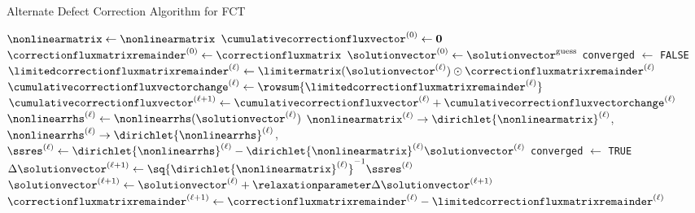 \begin{algorithm}[H]
\caption{Alternate Defect Correction Algorithm for FCT}
\label{alg:defect_correction_fct}
\begin{algorithmic}
\State $\nonlinearmatrix \gets \nonlinearmatrix$
\State $\cumulativecorrectionfluxvector^{(0)} \gets \mathbf{0}$
\State $\correctionfluxmatrixremainder^{(0)} \gets \correctionfluxmatrix$
\State $\solutionvector^{(0)} \gets \solutionvector^{\text{guess}}$
\State \texttt{converged} $\gets$ \texttt{FALSE}
  \State $\limitedcorrectionfluxmatrixremainder^{(\ell)} \gets
    \limitermatrix(\solutionvector^{(\ell)})\odot
    \correctionfluxmatrixremainder^{(\ell)}$
  \State $\cumulativecorrectionfluxvectorchange^{(\ell)} \gets
    \rowsum{\limitedcorrectionfluxmatrixremainder^{(\ell)}}$
  \State $\cumulativecorrectionfluxvector^{(\ell+1)} \gets
    \cumulativecorrectionfluxvector^{(\ell)}
    + \cumulativecorrectionfluxvectorchange^{(\ell)}$
  \State $\nonlinearrhs^{(\ell)} \gets
    \nonlinearrhs(\solutionvector^{(\ell)})$
  \State $\nonlinearmatrix^{(\ell)} \rightarrow
    \dirichlet{\nonlinearmatrix}^{(\ell)}$,
    $\nonlinearrhs^{(\ell)} \rightarrow \dirichlet{\nonlinearrhs}^{(\ell)}$,
  \State $\ssres^{(\ell)} \gets \dirichlet{\nonlinearrhs}^{(\ell)}
    - \dirichlet{\nonlinearmatrix}^{(\ell)}\solutionvector^{(\ell)}$
    \State \texttt{converged} $\gets$ \texttt{TRUE}
    \Break
  \EndIf
  \State $\Delta\solutionvector^{(\ell+1)}
    \gets \sq{\dirichlet{\nonlinearmatrix}^{(\ell)}}^{-1}\ssres^{(\ell)}$
  \State $\solutionvector^{(\ell+1)} \gets \solutionvector^{(\ell)}
    + \relaxationparameter\Delta\solutionvector^{(\ell+1)}$
  \State $\correctionfluxmatrixremainder^{(\ell+1)} \gets 
    \correctionfluxmatrixremainder^{(\ell)}
    - \limitedcorrectionfluxmatrixremainder^{(\ell)}$
\EndFor
{}
\EndIf
\end{algorithmic}
\end{algorithm}

